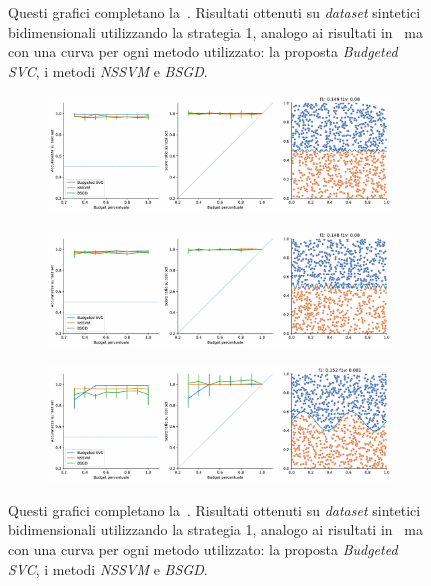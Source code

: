\begin{appendices}
\begin{figure}[b!]
\begin{subfigure}{.8\textwidth}
    \end{subfigure}
    \caption[Risultati su \emph{dataset} sintetici utilizzando strategia 1 in confronto ad altri metodi.]{Questi grafici completano la~. Risultati ottenuti su \emph{dataset} sintetici bidimensionali utilizzando la strategia 1, analogo ai risultati in~ ma con una curva per ogni metodo utilizzato: la proposta \emph{Budgeted SVC}, i metodi \emph{NSSVM} e \emph{BSGD}.}
\end{figure}
\begin{figure}[ht]\ContinuedFloat
    \centering
    \begin{subfigure}{.8\textwidth}
        \centering
        \includegraphics[width=\textwidth]{img/comp_old/6.pdf}
    \end{subfigure}%
    \hfill
    \begin{subfigure}{.8\textwidth}
        \centering
        \includegraphics[width=\textwidth]{img/comp_old/7.pdf}
    \end{subfigure}
    \hfill
    \begin{subfigure}{.8\textwidth}
        \centering
        \includegraphics[width=\textwidth]{img/comp_old/11.pdf}
    \end{subfigure}%
    \caption[]{Questi grafici completano la~. Risultati ottenuti su \emph{dataset} sintetici bidimensionali utilizzando la strategia 1, analogo ai risultati in~ ma con una curva per ogni metodo utilizzato: la proposta \emph{Budgeted SVC}, i metodi \emph{NSSVM} e \emph{BSGD}.}
\end{figure}


\end{appendices}
